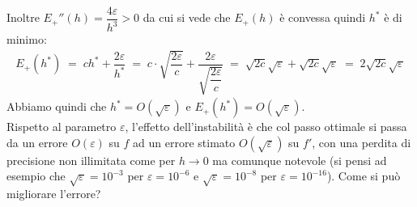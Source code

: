 \documentclass[12pt,a4paper]{article}
\begin{document}
Inoltre $E_+''(h)=\dfrac{4\varepsilon}{h^3}>0$ da cui si vede che $E_+(h)$ è convessa quindi $h^*$ è di minimo:
\[ \begin{split}
	E_+(h^*) \; = \; ch^* + \dfrac{2\varepsilon}{h^*} \; = \; c\cdot \sqrt{\dfrac{2\varepsilon}{c}} + \dfrac{2\varepsilon}{\sqrt{\dfrac{2\varepsilon}{c}}} \; = \; \sqrt{2c} \sqrt{\varepsilon} + \sqrt{2c} \sqrt{\varepsilon} \; = \; 2 \sqrt{2c} \sqrt{\varepsilon}
\end{split} \]
Abbiamo quindi che $h^*=O(\sqrt{\varepsilon})$ e $E_+(h^*)=O(\sqrt{\varepsilon})$.\\
Rispetto al parametro $\varepsilon$, l'effetto dell'instabilità è che col passo ottimale si passa da un errore $O(\varepsilon)$ su $f$ ad un errore stimato $O(\sqrt{\varepsilon})$ su $f'$, con una perdita di precisione non illimitata come per $h\to 0$ ma comunque notevole (si pensi ad esempio che $\sqrt{\varepsilon}=10^{-3}$ per $\varepsilon=10^{-6}$ e $\sqrt{\varepsilon}=10^{-8}$ per $\varepsilon=10^{-16}$).
Come si può migliorare l'errore?\\
\end{document}
